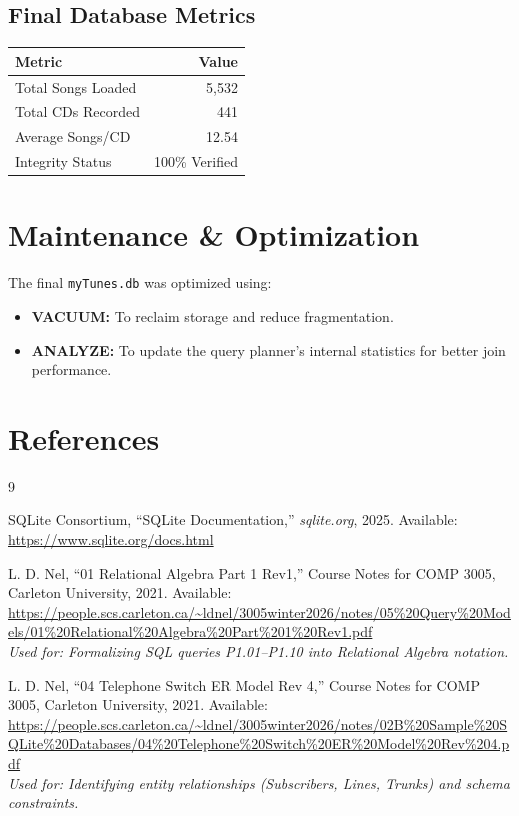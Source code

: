 \documentclass[11pt]{article}
\begin{document}
\subsection{Final Database Metrics}
\begin{table}[H]
    \centering
    \begin{tabular}{lr}
        \toprule
        \textbf{Metric} & \textbf{Value} \\
        \midrule
        Total Songs Loaded & 5,532 \\
        Total CDs Recorded & 441 \\
        Average Songs/CD & 12.54 \\
        Integrity Status & 100\% Verified \\
        \bottomrule
    \end{tabular}
\end{table}

\section{Maintenance \& Optimization}
The final \texttt{myTunes.db} was optimized using:
\begin{itemize}
    \item \textbf{VACUUM:} To reclaim storage and reduce fragmentation.
    \item \textbf{ANALYZE:} To update the query planner's internal statistics for better join performance.
\end{itemize}

\section{References}
\begin{thebibliography}{9}
    \raggedright
    SQLite Consortium, ``SQLite Documentation,'' \textit{sqlite.org}, 2025. 
    Available: \url{https://www.sqlite.org/docs.html}

    L. D. Nel, ``01 Relational Algebra Part 1 Rev1,'' Course Notes for COMP 3005, Carleton University, 2021.
    Available: \url{https://people.scs.carleton.ca/~ldnel/3005winter2026/notes/05%20Query%20Models/01%20Relational%20Algebra%20Part%201%20Rev1.pdf} \\
    \textit{Used for: Formalizing SQL queries P1.01--P1.10 into Relational Algebra notation.}

    L. D. Nel, ``04 Telephone Switch ER Model Rev 4,'' Course Notes for COMP 3005, Carleton University, 2021. 
    Available: \url{https://people.scs.carleton.ca/~ldnel/3005winter2026/notes/02B%20Sample%20SQLite%20Databases/04%20Telephone%20Switch%20ER%20Model%20Rev%204.pdf} \\
    \textit{Used for: Identifying entity relationships (Subscribers, Lines, Trunks) and schema constraints.}
\end{thebibliography}
\end{document}

